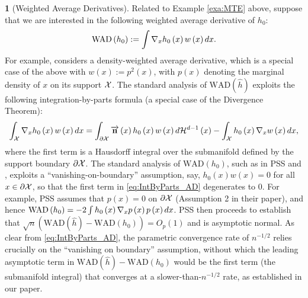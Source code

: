 \documentclass[12pt,american]{article}
\theoremstyle{definition}
\newtheorem{example}{\protect\examplename}
\theoremstyle{plain}
\theoremstyle{definition}
\theoremstyle{plain}
\theoremstyle{plain}
\theoremstyle{plain}
\theoremstyle{plain}
\theoremstyle{plain}
\providecommand{\examplename}{Example}
\providecommand{\examplename}{Example}
\begin{document}
\begin{example}[Weighted Average Derivatives]
  \label{exa:AvgDer} Related to Example \ref{exa:MTE} above, suppose
  that we are interested in the following weighted average derivative
  of $h_0$:
  \[
    \text{WAD}\left(h_{0}\right):=\int\nabla_x h_{0}\left(x\right)w\left(x\right)dx.
  \]
  For example, \citet*[PSS thereafter]{powell1989} considers a density-weighted
  average derivative, which is a special case of the above
  with $w\left(x\right):=p^{2}\left(x\right)$, with $p\left(x\right)$
  denoting the marginal density of $x$ on its support ${\cal X}$.
  The standard analysis of $\text{WAD}\left(\hat{h}\right)$
  exploits the following integration-by-parts formula
  (a special case of the Divergence Theorem):
  \begin{equation}
    \int_{{\cal X}}\nabla_x h_{0}\left(x\right)w\left(x\right)dx=\int_{\partial{\cal X}}\overrightarrow{{\bf n}}\left(x\right) h_{0}\left(x\right)w\left(x\right)d{\cal H}^{d-1}\left(x\right)-\int_{{\cal X}}h_{0}\left(x\right)\nabla_x w\left(x\right)dx,\label{eq:IntByParts_AD}
  \end{equation}
  where the first term is a Hausdorff integral over the submanifold
  defined by the support boundary $\partial{\cal X}$. The standard
  analysis of $\text{WAD}\left(h_{0}\right)$, such as in PSS and \citet*{newey1993efficiency},
  exploits a ``vanishing-on-boundary'' assumption, say, $h_{0}\left(x\right)w\left(x\right)=0$
  for all $x\in{\cal \partial X}$, so that the first term in \eqref{eq:IntByParts_AD} degenerates to
  $0$.
  For example, PSS assumes that $p\left(x\right)=0$ on $\partial{\cal X}$
  (Assumption 2 in their paper), and hence $\text{WAD}\left(h_{0}\right)=-2\int h_{0}\left(x\right)\nabla_x p\left(x\right)p\left(x\right)dx$. PSS then proceeds to establish that $\sqrt{n} \left(\text{WAD}\left(\hat{h}\right)-\text{WAD}\left(h_{0}\right)\right)=O_p (1)$ and is asymptotic normal. As clear
  from \eqref{eq:IntByParts_AD}, the parametric convergence rate of $n^{-1/2}$ relies
  crucially on the ``vanishing on boundary'' assumption, without which
  the leading asymptotic term in $\text{WAD}\left(\hat{h}\right)-\text{WAD}\left(h_{0}\right)$ would be the first term (the submanifold integral) that converges at a slower-than-$n^{-1/2}$ rate, as established
  in our paper.
\end{example}
\end{document}
